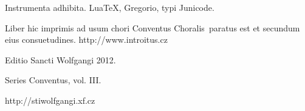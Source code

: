 \documentclass[a4paper, twoside, 12pt]{article}
\begin{document}
Instrumenta adhibita.
LuaTeX, %
Gregorio, %
typi Junicode. %

\begin{center}
Liber hic imprimis ad usum chori 
\guillemotright Conventus Choralis\guillemotleft\ 
paratus est
et secundum eius consuetudines.
http://www.introitus.cz

\vspace{1cm}

{\large Editio Sancti Wolfgangi 2012.}

\vspace{2mm}

Series \guillemotright Conventus\guillemotleft, vol. III.

\vspace{1cm}

http://stiwolfgangi.xf.cz

\end{center}

\vfill
\end{document}
